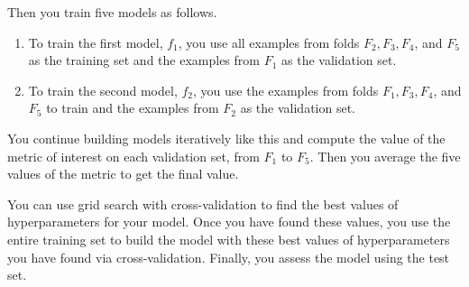 \documentclass[8pt,dvipsnames]{beamer}
\begin{document}
\begin{frame}
	Then you train five models as follows.
	\begin{enumerate}[3.]
		\item To train the first model, $f_{1}$, you use all examples from folds $F_{2}, F_{3}, F_{4}$, and $F_{5}$ as the training set and the examples from $F_{1}$ as the validation set.
		\item To train the second model, $f_{2}$, you use the examples from folds $F_{1}, F_{3}, F_{4}$, and $F_{5}$ to train and the examples from $F_{2}$ as the validation set.
	\end{enumerate}
	You continue building models iteratively like this and compute the value of the metric of interest on each validation set, from $F_{1}$ to $F_{5}$. Then you average the five values of the metric to get the final value.

	You can use grid search with cross-validation to find the best values of hyperparameters for your model. Once you have found these values, you use the entire training set to build the model with these best values of hyperparameters you have found via cross-validation. Finally, you assess the model using the test set.
\end{frame}
\end{document}
